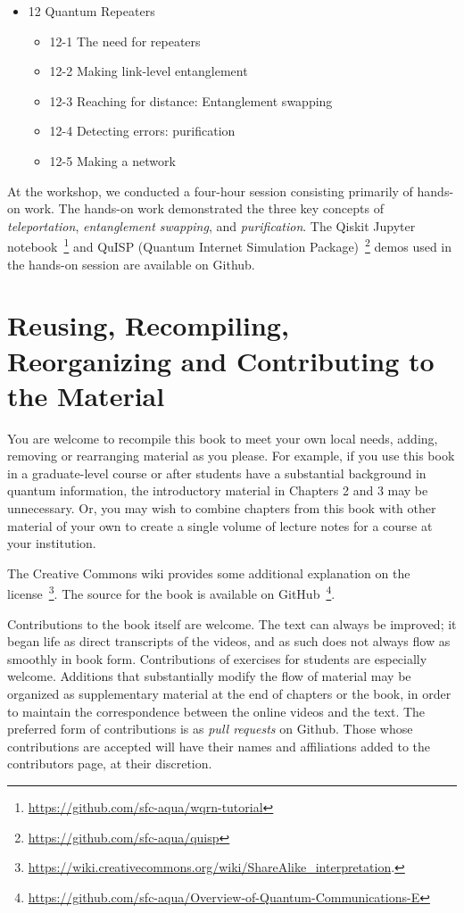 \begin{itemize}
\begin{itemize}
\item 8-2 Teleportation protocol
\item 8-3 No-cloning theorem and FTL communication
\end{itemize}
\item 12 Quantum Repeaters
\begin{itemize}
\item 12-1 The need for repeaters
\item 12-2 Making link-level entanglement
\item 12-3 Reaching for distance: Entanglement swapping
\item 12-4 Detecting errors: purification
\item 12-5 Making a network 
\end{itemize}
\end{itemize}

At the workshop, we conducted a four-hour session consisting primarily of hands-on work.  The hands-on work demonstrated the three key concepts of \emph{teleportation}, \emph{entanglement swapping}, and \emph{purification}. The Qiskit Jupyter notebook~\footnote{\url{https://github.com/sfc-aqua/wqrn-tutorial}} and QuISP (Quantum Internet Simulation Package)~\footnote{\url{https://github.com/sfc-aqua/quisp}} demos used in the hands-on session are available on Github. 

\section*{Reusing, Recompiling, Reorganizing and Contributing to the Material}

You are welcome to recompile this book to meet your own local needs, adding, removing or rearranging material as you please. For example, if you use this book in a graduate-level course or after students have a substantial background in quantum information, the introductory material in Chapters 2 and 3 may be unnecessary. Or, you may wish to combine chapters from this book with other material of your own to create a single volume of lecture notes for a course at your institution.

The Creative Commons wiki provides some additional explanation on the license~\footnote{\url{https://wiki.creativecommons.org/wiki/ShareAlike_interpretation}.}.  The source for the book is available on GitHub~\footnote{\url{https://github.com/sfc-aqua/Overview-of-Quantum-Communications-E}}. 

Contributions to the book itself are welcome.  The text can always be improved; it began life as direct transcripts of the videos, and as such does not always flow as smoothly in book form.  Contributions of exercises for students are especially welcome.  Additions that substantially modify the flow of material may be organized as supplementary material at the end of chapters or the book, in order to maintain the correspondence between the online videos and the text.  The preferred form of contributions is as \emph{pull requests} on Github.  Those whose contributions are accepted will have their names and affiliations added to the contributors page, at their discretion.
